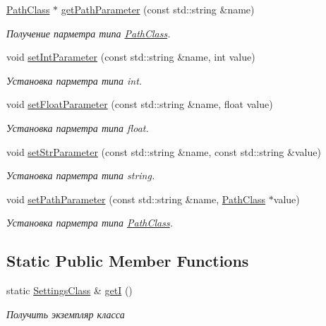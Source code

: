 \begin{DoxyCompactItemize}
\hyperlink{class_path_class}{Path\+Class} $\ast$ \hyperlink{class_settings_class_acb9a95b43f31fd24fa91e1bec7590c78}{get\+Path\+Parameter} (const std\+::string \&name)
\begin{DoxyCompactList}\small\item\em Получение парметра типа \hyperlink{class_path_class}{Path\+Class}. \end{DoxyCompactList}\item 
void \hyperlink{class_settings_class_af9077f8328dc406c6645f223a2f8c517}{set\+Int\+Parameter} (const std\+::string \&name, int value)
\begin{DoxyCompactList}\small\item\em Установка парметра типа int. \end{DoxyCompactList}\item 
void \hyperlink{class_settings_class_a364c078ea6a7fdf03716a60b4b6b503a}{set\+Float\+Parameter} (const std\+::string \&name, float value)
\begin{DoxyCompactList}\small\item\em Установка парметра типа float. \end{DoxyCompactList}\item 
void \hyperlink{class_settings_class_aeb2d859bd8e93417ddde49bcd4bf3fbf}{set\+Str\+Parameter} (const std\+::string \&name, const std\+::string \&value)
\begin{DoxyCompactList}\small\item\em Установка парметра типа string. \end{DoxyCompactList}\item 
void \hyperlink{class_settings_class_a9c4dce5d179b06c4c180b99947c62fe1}{set\+Path\+Parameter} (const std\+::string \&name, \hyperlink{class_path_class}{Path\+Class} $\ast$value)
\begin{DoxyCompactList}\small\item\em Установка парметра типа \hyperlink{class_path_class}{Path\+Class}. \end{DoxyCompactList}\end{DoxyCompactItemize}
\subsection*{Static Public Member Functions}
\begin{DoxyCompactItemize}
\item 
static \hyperlink{class_settings_class}{Settings\+Class} \& \hyperlink{class_settings_class_a24473783853e6fb498055a1bd44b162d}{getI} ()
\begin{DoxyCompactList}\small\item\em Получить экземпляр класса \end{DoxyCompactList}\end{DoxyCompactItemize}
